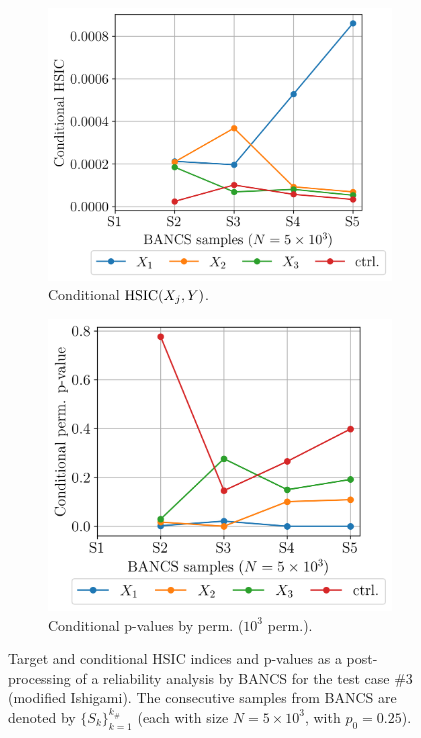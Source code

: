 \begin{figure}
    \\[20pt]
    \begin{subfigure}[b]{0.48\linewidth}
        \centering
        \includegraphics[width=\linewidth]{part3/figures/BANCS/ishigami_CHSIC.png}
        \caption{Conditional $\mathrm{HSIC}(X_j, Y)$.}
    \end{subfigure}
    \begin{subfigure}[b]{0.48\linewidth}
        \centering
        \includegraphics[width=\linewidth]{part3/figures/BANCS/ishigami_Cpvalue_permutation.png}
        \caption{Conditional p-values by perm. ($10^3$ perm.).}
    \end{subfigure}
    \caption{Target and conditional HSIC indices and p-values as a post-processing of a reliability analysis by BANCS for the test case \#3 (modified Ishigami). 
                The consecutive samples from BANCS are denoted by $\{S_k\}_{k=1}^{k_\#}$ (each with size $N=5\times10^3$, with $p_0=0.25$).}
    \label{fig:rosa_ishigami}
\end{figure}


